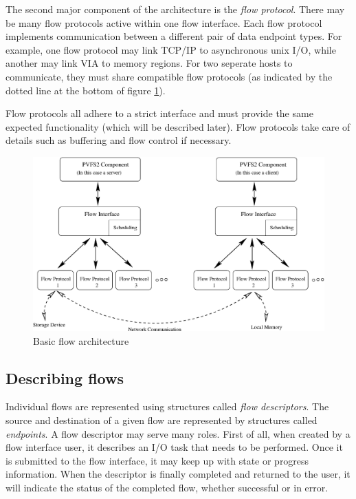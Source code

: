 \documentclass[12pt]{article} %
\begin{document}
The second major component of the architecture is the \emph{flow
protocol}.
There may be many flow protocols active within one flow interface.  Each
flow protocol implements communication between a different pair of data
endpoint types.  For example, one flow protocol may link TCP/IP to
asynchronous unix I/O, while another may link VIA to memory regions.  For
two seperate hosts to communicate, they must share compatible flow
protocols (as indicated by the dotted line at the bottom of figure
\ref{fig:flow-arch}).

Flow protocols all adhere to a strict interface 
and must provide the same expected functionality (which will be
described later).  Flow protocols take care of details such as buffering
and flow control if necessary.

\begin{figure}
\begin{center}
\caption{Basic flow architecture \label{fig:flow-arch}}
\includegraphics[scale=0.6]{flow-arch.eps}
\end{center}
\end{figure}

\subsection{Describing flows}

Individual flows are represented using structures called \emph{flow
descriptors}.  The source and destination of a given flow are represented
by structures called \emph{endpoints}.  A flow descriptor may serve
many roles.  First of all, when created by a flow interface user, it
describes an I/O task that needs to be performed.  Once it is submitted
to the flow interface, it may keep up with state or progress information.
When the descriptor is finally completed and returned to the user, it will
indicate the status of the completed flow, whether successful or in error.
\end{document}
